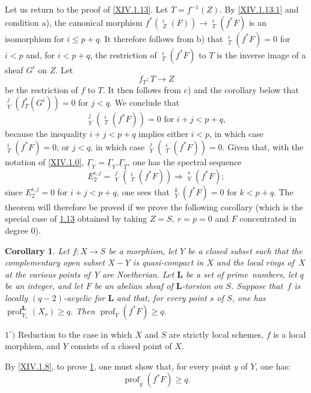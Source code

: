 \documentclass[11pt,a4paper,oneside]{book}
\providecommand{\pageoriginale}{%
  \refstepcounter{pageoriginal}%
  \marginpar{\raggedright\footnotesize\bfseries\thepageoriginal}%
  \xspace}
\providecommand{\LL}{\mathbf L}
\providecommand{\h}{\mathop{\underline{H}}\nolimits}
\providecommand{\prof}{\operatorname{prof}}
\providecommand{\To}{\Longrightarrow}
\theoremstyle{plain}
\newtheorem{corollaire}[subsection]{Corollary}
\theoremstyle{definition}
\theoremstyle{remark}
\renewcommand{\Ref}[1]{\textup{\ref{#1}}}
\begin{document}
Let us return to the proof of \Ref{XIV.1.13}. Let $T=f^{-1}(Z)$. By \Ref{XIV.1.13.1} and condition a), the canonical morphism $f^*(\h_Z^i(F))\to\h_T^i(f^*F)$ is an isomorphism for $i\leq p+q$. It therefore follows from b) that $\h^i_T(f^*F)=0$ for $i<p$ and, for $i<p+q$, the restriction of $\h^i_T(f^*F)$ to $T$ is the inverse image of a sheaf $G^i$ on $Z$. Let
$$f_T:T\to Z$$
be the restriction of $f$ to $T$. It then follows from c) and the corollary below that $\h^j_Y(f^*_T(G^i))=0$ for $j<q$. We conclude that
$$
\h^j_Y(\h^i_T(f^*F))=0\text{ for } i+j<p+q,
$$
because the inequality $i+j<p+q$ implies either $i<p$, in which case $\h^i_T(f^*F)=0$, or $j<q$, in which case $\h_Y^j(\h_T^i(f^*F))=0$. Given that, with the notation of \Ref{XIV.1.0}, $\underline{\Gamma}_Y=\underline{\Gamma}_Y.\underline{\Gamma}_T$, one has the spectral sequence
\begin{equation*} \label{eq:XIV.1.13.2} \tag{1.13.2}
E_2^{i, j}=\h_Y^j(\h_T^i(f^*F))\To\h^*_Y(f^*F);
\end{equation*}
since\pageoriginale $E_2^{i, j}=0$ for $i+j<p+q$, one sees that $\h_Y^k(f^*F)=0$ for $k<p+q$. The theorem will therefore be proved if we prove the following corollary (which is the special case of \hyperref[XIV.1.13]{1.13} obtained by taking $Z=S, \ r=p=0$ and $F$ concentrated in degree $0$).

\begin{corollaire}\label{XIV.1.14}
Let $f:X\to S$ be a morphism, let $Y$ be a closed subset such that the complementary open subset $X-Y$ is quasi-compact in $X$ and the local rings of~$X$ at the various points of~$Y$ are Noetherian. Let $\LL$ be a set of \hbox{prime numbers}, let $q$ be an integer, and let $F$ be an abelian sheaf of $\LL$-torsion on $S$. Suppose that~$f$ is locally $(q-2)$-acyclic for $\LL$ and that, for every point $s$ of $S$, one has \hbox{$\prof_{Y_s}^\LL(X_s)\!\geq\! q$}. Then $\prof_Y(f^*F)\geq q$.
\end{corollaire}

$1^\circ)$ Reduction to the case in which $X$ and $S$ are strictly local schemes, $f$ is a local morphism, and $Y$ consists of a closed point of $X$.

By \Ref{XIV.1.8}, to prove \Ref{XIV.1.14}, one must show that, for every point $y$ of $Y$, one has:$$
\prof_y(f^*F)\geq q.
$$
\end{document}
